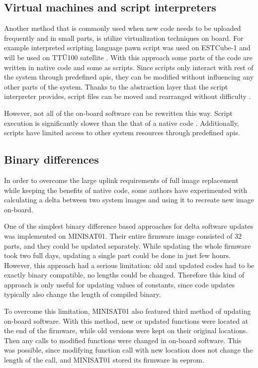 \subsection{Virtual machines and script interpreters}

Another method that is commonly used when new code needs to be uploaded frequently and in small parts, is utilize virtualization techniques on board. For example interpreted scripting language pawn script was used on ESTCube-1 \cite{Suenter2016} and will be used on TTÜ100 satellite \cite{Aasavaeli2017}. With this approach some parts of the code are written in native code and some as scripts. Since scripts only interact with rest of the system through predefined \glspl{api}, they can be modified without influencing any other parts of the system. Thanks to the abstraction layer that the script interpreter provides, script files can be moved and rearranged without difficulty \cite{Riemersm}.

However, not all of the on-board software can be rewritten this way. Script execution is significantly slower than the that of a native code . Additionally, scripts have limited access to other system resources through predefined \glspl{api}.


\subsection{Binary differences}

In order to overcome the large uplink requirements of full image replacement while keeping the benefits of native code, some authors have experimented with calculating a delta between two system images and using it to recreate new image on-board.

One of the simplest binary difference based approaches for delta software updates was implemented on MINISAT01. Their entire firmware image consisted of 32 parts, and they could be updated separately. While updating the whole firmware took two full days, updating a single part could be done in just few hours. However, this approach had a serious limitation: old and updated codes had to be exactly binary compatible, no lengths could be changed. Therefore this kind of approach is only useful for updating values of constants, since code updates typically also change the length of compiled binary. \cite{Garrido1998}

To overcome this limitation, MINISAT01 also featured third method of updating on-board software. With this method, new or updated functions were located at the end of the firmware, while old versions were kept on their original locations. Then any calls to modified functions were changed in on-board software. This was possible, since modifying function call with new location does not change the length of the call, and MINISAT01 stored its firmware in \gls{eeprom}. \cite{Garrido1998} 

